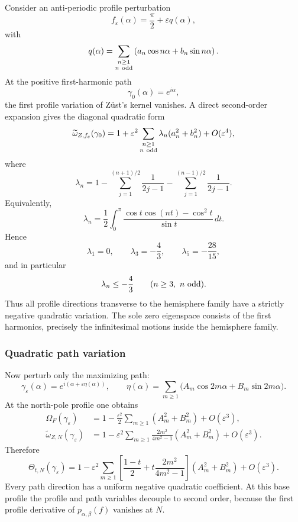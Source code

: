 \documentclass[11pt]{article}
\newcommand{\eps}{\varepsilon}
\begin{document}
Consider an anti-periodic profile perturbation
\[
        f_\eps(\alpha)
        =\frac{\pi}{2}+\eps q(\alpha),
\]
with
\[
 q(\alpha)
 =
 \sum_{\substack{n\ge1\\ n\ {\rm odd}}}
 \left(a_n\cos n\alpha+b_n\sin n\alpha\right).
\]
At the positive first-harmonic path
\[
        \gamma_0(\alpha)=e^{i\alpha},
\]
the first profile variation of Z\"ust's kernel vanishes.  A direct
second-order expansion gives the diagonal quadratic form
\begin{equation}\label{eq:Z-profile-Hessian}
 \widetilde\omega_{Z,f_\eps}(\gamma_0)
 =
 1+\eps^2
 \sum_{\substack{n\ge1\\n\ {\rm odd}}}
 \lambda_n(a_n^2+b_n^2)
 +O(\eps^4),
\end{equation}
where
\begin{equation}\label{eq:lambda-n}
 \lambda_n
 =
 1
 -
 \sum_{j=1}^{(n+1)/2}\frac1{2j-1}
 -
 \sum_{j=1}^{(n-1)/2}\frac1{2j-1}.
\end{equation}
Equivalently,
\begin{equation}\label{eq:lambda-integral}
 \lambda_n
 =
 \frac12\int_0^\pi
 \frac{\cos t\cos(nt)-\cos^2t}{\sin t}\,dt .
\end{equation}
Hence
\[
        \lambda_1=0,
        \qquad
        \lambda_3=-\frac43,
        \qquad
        \lambda_5=-\frac{28}{15},
\]
and in particular
\begin{equation}\label{eq:profile-gap}
        \lambda_n\le-\frac43
        \qquad(n\ge3,\ n\ {\rm odd}).
\end{equation}
Thus all profile directions transverse to the hemisphere family have a
strictly negative quadratic variation.  The sole zero eigenspace consists
of the first harmonics, precisely the infinitesimal motions inside the
hemisphere family.

\subsubsection{Quadratic path variation}

Now perturb only the maximizing path:
\[
 \gamma_\eps(\alpha)
 =
 e^{i(\alpha+\eps\eta(\alpha))},
 \qquad
 \eta(\alpha)
 =
 \sum_{m\ge1}
 \bigl(A_m\cos2m\alpha+B_m\sin2m\alpha\bigr).
\]
At the north-pole profile one obtains
\begin{align}
 \Omega_F(\gamma_\eps)
 &=
 1-\frac{\eps^2}{2}
 \sum_{m\ge1}(A_m^2+B_m^2)+O(\eps^3),
 \label{eq:F-path-Hessian}\\
 \widetilde\omega_{Z,N}(\gamma_\eps)
 &=
 1-\eps^2
 \sum_{m\ge1}
 \frac{2m^2}{4m^2-1}
 (A_m^2+B_m^2)+O(\eps^3).
 \label{eq:Z-path-Hessian}
\end{align}
Therefore
\begin{equation}\label{eq:hybrid-path-Hessian}
 \Theta_{t,N}(\gamma_\eps)
 =
 1-\eps^2
 \sum_{m\ge1}
 \left[
 \frac{1-t}{2}
 +
 t\frac{2m^2}{4m^2-1}
 \right]
 (A_m^2+B_m^2)
 +O(\eps^3).
\end{equation}
Every path direction has a uniform negative quadratic coefficient.  At
this base profile the profile and path variables decouple to second order,
because the first profile derivative of
$p_{\alpha,\beta}(f)$ vanishes at $N$.
\end{document}
